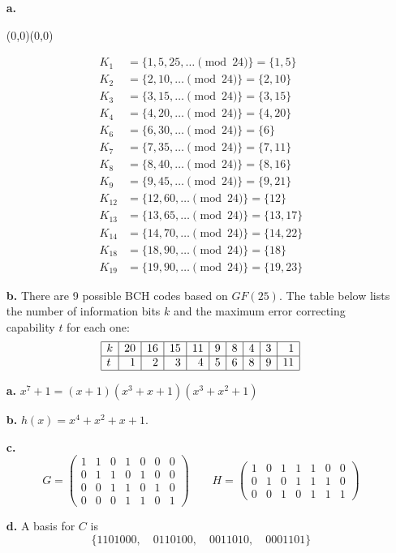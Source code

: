 \documentclass[11pt]{article}
\newcommand{\vc}[1]{\begin{pmatrix}#1\end{pmatrix}}
\newcommand{\moveup}{\begin{picture}(0,0)(0,0)\end{picture}\vspace*{-8.15mm}}
\begin{document}
\medskip
{}
\begin{itemize}
  \item[{\bf a.}] \moveup
    \begin{align*}
      K_1    &= \{ 1,5,25,\ldots\pmod{24}\} = \{1,5\}\\
      K_2    &= \{ 2,10,\ldots \pmod{24}\} = \{2,10\}\\
      K_3    &= \{ 3,15,\ldots \pmod{24}\} = \{3,15\}\\
      K_4    &= \{ 4,20,\ldots \pmod{24}\} = \{4,20\}\\
      K_6    &= \{ 6,30,\ldots \pmod{24}\} = \{6\}\\
      K_7    &= \{ 7,35,\ldots \pmod{24}\} = \{7,11\}\\
      K_8    &= \{ 8,40,\ldots \pmod{24}\} = \{8,16\}\\
      K_9    &= \{ 9,45,\ldots \pmod{24}\} = \{9,21\}\\
      K_{12} &= \{12,60,\ldots \pmod{24}\} = \{12\}\\
      K_{13} &= \{13,65,\ldots \pmod{24}\} = \{13,17\}\\
      K_{14} &= \{14,70,\ldots \pmod{24}\} = \{14,22\}\\
      K_{18} &= \{18,90,\ldots \pmod{24}\} = \{18\}\\
      K_{19} &= \{19,90,\ldots \pmod{24}\} = \{19,23\}
    \end{align*}
  \item[{\bf b.}]
  There are 9 possible BCH codes based on $GF(25)$.
  The table below lists the number of information bits $k$
  and the maximum error correcting capability $t$ for each one:
  \[
    \begin{array}{|l|r|r|r|r|r|r|r|r|r|}\hline
      k & 20 & 16 & 15 & 11 & 9 & 8 & 4 & 3 & 1\\\hline
      t &  1 &  2 &  3 &  4 & 5 & 6 & 8 & 9 & 11\\\hline
    \end{array}
  \]
\end{itemize}

\medskip
{}
\begin{itemize}
\item[{\bf a.}] $x^7+1 = (x+1)(x^3+x+1)(x^3+x^2+1)$
\item[{\bf b.}] $h(x)= x^4+x^2+x+1$.
\item[{\bf c.}]
  \[
    G = \vc{1&1&0&1&0&0&0\\
            0&1&1&0&1&0&0\\
            0&0&1&1&0&1&0\\
            0&0&0&1&1&0&1}\qquad
    H = \vc{1&0&1&1&1&0&0\\
            0&1&0&1&1&1&0\\
            0&0&1&0&1&1&1}
  \]
\item[{\bf d.}] A basis for $C$ is
  \[
    \{1101000,\quad
      0110100,\quad
      0011010,\quad
      0001101\}
  \]
\end{itemize}
\end{document}
